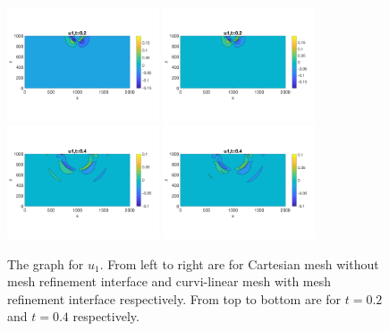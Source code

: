 \begin{figure}[htbp]
	\centering
	\includegraphics[width=0.4\textwidth,trim={0 2.8cm 0 2.8cm}, clip]{u1_t02_cartesian.png}
	\includegraphics[width=0.4\textwidth,trim={0 2.8cm 0 2.8cm}, clip]{u1_t02_curvi_mr.png}\\
	\includegraphics[width=0.4\textwidth,trim={0 2.8cm 0 2.8cm}, clip]{u1_t04_cartesian.png}
	\includegraphics[width=0.4\textwidth,trim={0 2.8cm 0 2.8cm}, clip]{u1_t04_curvi_mr.png}
	\caption{The graph for $u_1$. From left to right are for Cartesian mesh without mesh refinement interface and curvi-linear mesh with mesh refinement interface respectively. From top to bottom are for $t = 0.2$ and $t = 0.4$ respectively.}\label{u1}
\end{figure}

